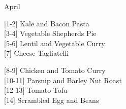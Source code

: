 		\begin{menu}{April}
    
    \begin{recipelist}
    
        {\scriptsize[1-2]} Kale and Bacon Pasta\\
        {\scriptsize[3-4]} Vegetable Shepherds Pie\\
        {\scriptsize[5-6]} Lentil and Vegetable Curry\\
        {\scriptsize[7]} Cheese Tagliatelli\\%
    \end{recipelist}%
    \begin{recipelist}
    
        {\scriptsize[8-9]} Chicken and Tomato Curry\\
        {\scriptsize[10-11]} Parsnip and Barley Nut Roast\\
        {\scriptsize[12-13]} Tomato Tofu\\
        {\scriptsize[14]} Scrambled Egg and Beans\\%
    \end{recipelist}\par%
  

\end{menu}
